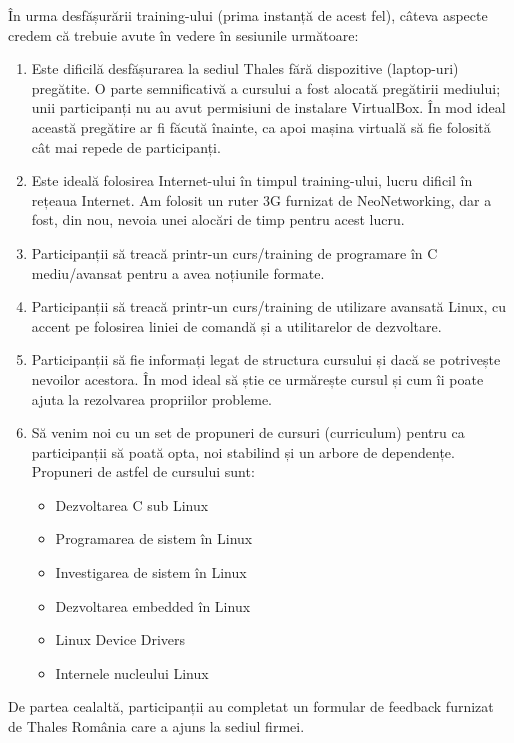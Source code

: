 \documentclass[12pt]{article}
\begin{document}
În urma desfășurării training-ului (prima instanță de acest fel), câteva aspecte credem că trebuie avute în vedere în sesiunile următoare:
\begin{enumerate}
  \item Este dificilă desfășurarea la sediul Thales fără dispozitive (laptop-uri) pregătite. O parte semnificativă a cursului a fost alocată pregătirii mediului; unii participanți nu au avut permisiuni de instalare VirtualBox. În mod ideal această pregătire ar fi făcută înainte, ca apoi mașina virtuală să fie folosită cât mai repede de participanți.
  \item Este ideală folosirea Internet-ului în timpul training-ului, lucru dificil în rețeaua Internet. Am folosit un ruter 3G furnizat de NeoNetworking, dar a fost, din nou, nevoia unei alocări de timp pentru acest lucru.
  \item Participanții să treacă printr-un curs/training de programare în C mediu/avansat pentru a avea noțiunile formate.
  \item Participanții să treacă printr-un curs/training de utilizare avansată Linux, cu accent pe folosirea liniei de comandă și a utilitarelor de dezvoltare.
  \item Participanții să fie informați legat de structura cursului și dacă se potrivește nevoilor acestora. În mod ideal să știe ce urmărește cursul și cum îi poate ajuta la rezolvarea propriilor probleme.
  \item Să venim noi cu un set de propuneri de cursuri (curriculum) pentru ca participanții să poată opta, noi stabilind și un arbore de dependențe. Propuneri de astfel de cursului sunt:
    \begin{itemize}
      \item Dezvoltarea C sub Linux
      \item Programarea de sistem în Linux
      \item Investigarea de sistem în Linux
      \item Dezvoltarea embedded în Linux
      \item Linux Device Drivers
      \item Internele nucleului Linux
    \end{itemize}
\end{enumerate}

De partea cealaltă, participanții au completat un formular de feedback furnizat de Thales România care a ajuns la sediul firmei.
\end{document}
